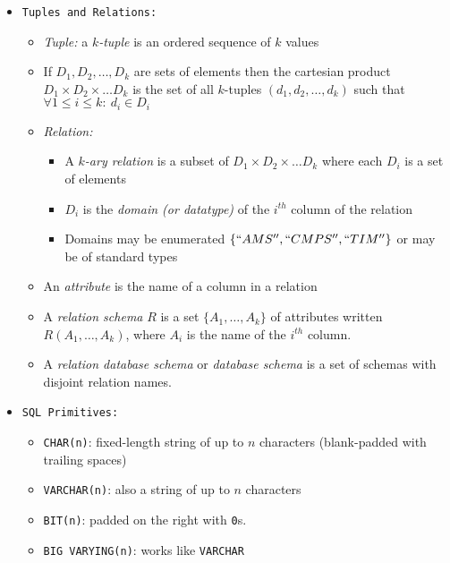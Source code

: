 \documentclass[landscape,8pt]{extarticle}
\newcommand{\code}{\lstinline}
\begin{document}
    \footnotesize
    \begin{multicols}{4}
    \setlength{\premulticols}{1pt}
    \setlength{\postmulticols}{1pt}
    \setlength{\multicolsep}{1pt}
    \setlength{\columnsep}{2pt}
    \begin{itemize}
    \item \code{Tuples and Relations:}
    \begin{itemize}
        \item \emph{Tuple:} a $k$\emph{-tuple} is an ordered sequence of $k$ values
        \item If $D_1, D_2, \ldots, D_k$ are sets of elements then the cartesian product $D_1 \times
        D_2 \times \ldots D_k$ is the set of all $k$-tuples $(d_1, d_2, \ldots, d_k)$ such that
        $\forall 1 \leq i \leq k:\ d_i \in D_i$
        \item \emph{Relation:}
        \begin{itemize}
            \item A $k$\emph{-ary relation} is a subset of $D_1 \times D_2 \times \ldots D_k$ where
            each $D_i$ is a set of elements
            \item $D_i$ is the \emph{domain (or datatype)} of the $i^{th}$ column of the relation
            \item Domains may be enumerated $\{``AMS'', ``CMPS'', ``TIM''\}$ or may be of standard
            types 
        \end{itemize}
        \item An \emph{attribute} is the name of a column in a relation
        \item A \emph{relation schema} $R$ is a set $\{A_1, \ldots, A_k\}$ of attributes written
        $R(A_1, \ldots, A_k)$, where $A_i$ is the name of the $i^{th}$ column. 
        \item A \emph{relation database schema} or \emph{database schema} is a set of 
        schemas with disjoint relation names.
    \end{itemize}
    \item \code{SQL Primitives:}
    \begin{itemize}
        \item \code{CHAR(n)}: fixed-length string of up to $n$ characters (blank-padded with
        trailing spaces)
        \item \code{VARCHAR(n)}: also a string of up to $n$ characters
        \item \code{BIT(n)}: padded on the right with \code{0}s.
        \item \code{BIG VARYING(n)}: works like \code{VARCHAR}

\end{itemize}
\end{itemize}
\end{multicols}
\end{document}
